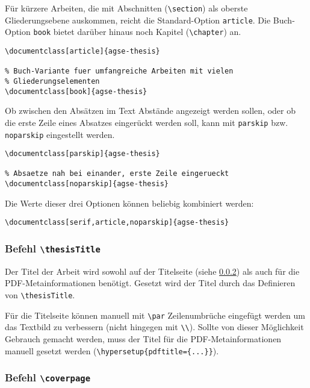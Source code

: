Für kürzere Arbeiten, die mit Abschnitten (\texttt{\textbackslash{}section})
als oberste Gliederungsebene auskommen, reicht die Standard-Option
\texttt{article}.
Die Buch-Option \texttt{book} bietet darüber hinaus noch Kapitel
(\texttt{\textbackslash{}chapter}) an.
\begin{lstlisting}[language={[LaTeX]TeX}]
% Standard fuer kuerzere Arbeiten
\documentclass[article]{agse-thesis}

% Buch-Variante fuer umfangreiche Arbeiten mit vielen
% Gliederungselementen
\documentclass[book]{agse-thesis}
\end{lstlisting}

Ob zwischen den Absätzen im Text Abstände angezeigt werden sollen, oder ob die
erste Zeile eines Absatzes eingerückt werden soll, kann mit \texttt{parskip}
bzw. \texttt{noparskip} eingestellt werden.
\begin{lstlisting}[language={[LaTeX]TeX}]
% Absaetze deutlich trennen
\documentclass[parskip]{agse-thesis}

% Absaetze nah bei einander, erste Zeile eingerueckt
\documentclass[noparskip]{agse-thesis}
\end{lstlisting}

Die Werte dieser drei Optionen können beliebig kombiniert werden:
\begin{lstlisting}[language={[LaTeX]TeX}]
% Einstellung des Beispieldokuments
\documentclass[serif,article,noparskip]{agse-thesis}
\end{lstlisting}

\subsubsection{Befehl \texttt{\textbackslash{}thesisTitle}}

Der Titel der Arbeit wird sowohl auf der Titelseite (siehe
\ref{sec:cmd-coverpage}) als auch für die PDF-Metainformationen benötigt.
Gesetzt wird der Titel durch das Definieren von
\texttt{\textbackslash{}thesisTitle}.

Für die Titelseite können manuell mit \texttt{\textbackslash{}par}
Zeilenumbrüche eingefügt werden um das Textbild zu verbessern (nicht hingegen
mit \texttt{\textbackslash\textbackslash}).
Sollte von dieser Möglichkeit Gebrauch gemacht werden, muss der Titel für die
PDF-Metainformationen manuell gesetzt werden
(\texttt{\textbackslash{}hypersetup\{pdftitle=\{...\}\}}).


\subsubsection{Befehl \texttt{\textbackslash{}coverpage}}
\label{sec:cmd-coverpage}

